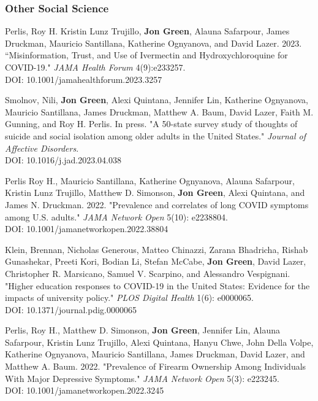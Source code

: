 \documentclass[letterpaper]{article}
\begin{document}
\subsubsection*{Other Social Science}

\begin{etaremune}

\item Perlis, Roy H. Kristin Lunz Trujillo, \textbf{Jon Green}, Alauna Safarpour, James Druckman, Mauricio Santillana, Katherine Ognyanova, and David Lazer. 2023. ``Misinformation, Trust, and Use of Ivermectin and Hydroxychloroquine for COVID-19." \textit{JAMA Health Forum} 4(9):e233257. \\
DOI: 10.1001/jamahealthforum.2023.3257

\item Smolnov, Nili, \textbf{Jon Green}, Alexi Quintana, Jennifer Lin, Katherine Ognyanova, Mauricio Santillana, James Druckman, Matthew A. Baum, David Lazer, Faith M. Gunning, and Roy H. Perlis. In press. "A 50-state survey study of thoughts of suicide and social isolation among older adults in the United States." \textit{Journal of Affective Disorders}. \\
DOI: 10.1016/j.jad.2023.04.038

\item Perlis Roy H., Mauricio Santillana, Katherine Ognyanova, Alauna Safarpour, Kristin Lunz Trujillo, Matthew D. Simonson, \textbf{Jon Green}, Alexi Quintana, and James N. Druckman. 2022. "Prevalence and correlates of long COVID symptoms among U.S. adults." \textit{JAMA Network Open} 5(10): e2238804. \\
DOI: 10.1001/jamanetworkopen.2022.38804

\item Klein, Brennan, Nicholas Generous, Matteo Chinazzi, Zarana Bhadricha, Rishab Gunashekar, Preeti Kori, Bodian Li, Stefan McCabe, \textbf{Jon Green}, David Lazer, Christopher R. Marsicano, Samuel V. Scarpino, and Alessandro Vespignani. "Higher education responses to COVID-19 in the United States: Evidence for the impacts of university policy." \textit{PLOS Digital Health} 1(6): e0000065. \\
DOI: 10.1371/journal.pdig.0000065

\item  Perlis, Roy H., Matthew D. Simonson, \textbf{Jon Green}, Jennifer Lin, Alauna Safarpour, Kristin Lunz Trujillo, Alexi Quintana, Hanyu Chwe, John Della Volpe, Katherine Ognyanova, Mauricio Santillana,  James Druckman, David Lazer, and Matthew A. Baum. 2022. "Prevalence of Firearm Ownership Among Individuals With Major Depressive Symptoms." \textit{JAMA Network Open} 5(3): e223245. \\
DOI: 10.1001/jamanetworkopen.2022.3245


\end{etaremune}
\end{document}
